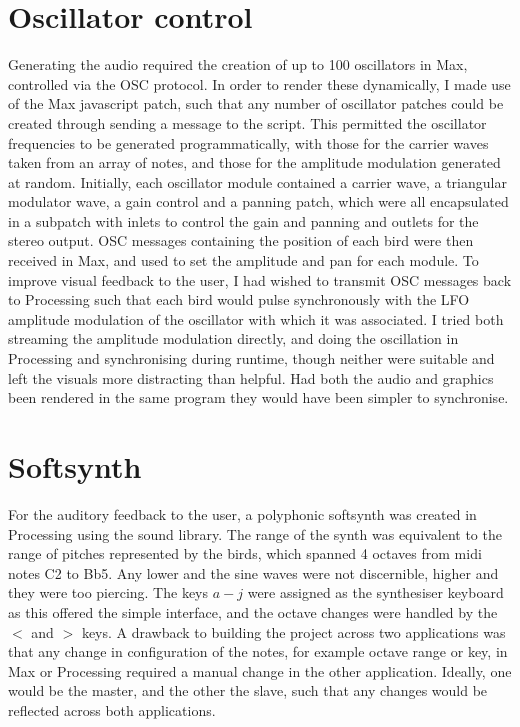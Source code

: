 \documentclass[journal, a4paper]{IEEEtran}
\begin{document}
\section*{Oscillator control}
Generating the audio required the creation of up to 100 oscillators in Max, controlled via the OSC protocol. In order to render these dynamically, I made use of the Max javascript patch, such that any number of oscillator patches could be created through sending a message to the script. This permitted the oscillator frequencies to be generated programmatically, with those for the carrier waves taken from an array of notes, and those for the amplitude modulation generated at random. Initially, each oscillator module contained a carrier wave, a triangular modulator wave, a gain control and a panning patch, which were all encapsulated in a subpatch with inlets to control the gain and panning and outlets for the stereo output. OSC messages containing the position of each bird were then received in Max, and used to set the amplitude and pan for each module.
To improve visual feedback to the user, I had wished to transmit OSC messages back to Processing such that each bird would pulse synchronously with the LFO amplitude modulation of the oscillator with which it was associated. I tried both streaming the amplitude modulation directly, and doing the oscillation in Processing and synchronising during runtime, though neither were suitable and left the visuals more distracting than helpful. Had both the audio and graphics been rendered in the same program they would have been simpler to synchronise.


\section*{Softsynth}
For the auditory feedback to the user, a polyphonic softsynth was created in Processing using the sound library. The range of the synth was equivalent to the range of pitches represented by the birds, which spanned 4 octaves from midi notes C2 to Bb5. Any lower and the sine waves were not discernible, higher and they were too piercing. The keys $a-j$ were assigned as the synthesiser keyboard as this offered the simple interface, and the octave changes were handled by the $<$ and $>$ keys.
A drawback to building the project across two applications was that any change in configuration of the notes, for example octave range or key, in Max or Processing required a manual change in the other application. Ideally, one would be the master, and the other the slave, such that any changes would be reflected across both applications.
\end{document}
